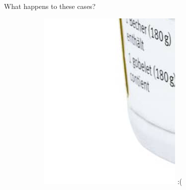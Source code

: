 \documentclass{beamer}
\begin{document}
\begin{frame}{What happens to these cases?}
\begin{figure}[H]
\begin{subfigure}{.32\textwidth}
		\includegraphics[width=\textwidth]{m-classic-joghurt-ahornsirup-stichfest-zoom3}
		\pause
		:(
	\end{subfigure}
\end{figure}
\end{frame}
\end{document}

